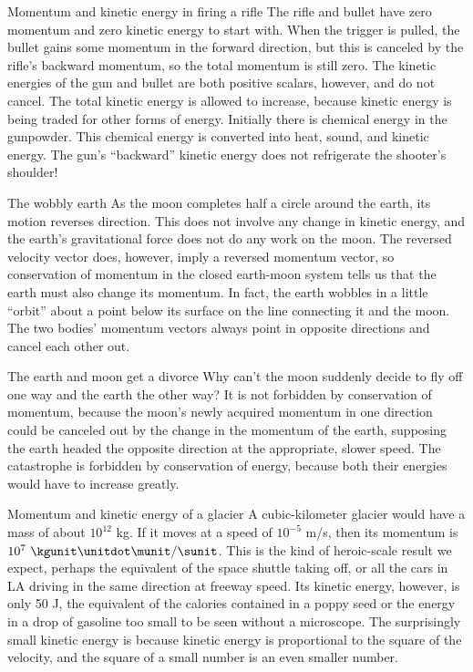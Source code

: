 \begin{eg}{Momentum and kinetic energy in firing a rifle}
The rifle and bullet have zero momentum and zero kinetic
energy to start with. When the trigger is pulled, the bullet
gains some momentum in the forward direction, but this is
canceled by the rifle's backward momentum, so the total
momentum is still zero. The kinetic energies of the gun and
bullet are both positive scalars, however, and do not
cancel. The total kinetic energy is allowed to increase,
because kinetic energy is being traded for other forms of
energy. Initially there is chemical energy in the gunpowder.
This chemical energy is converted into heat, sound, and
kinetic energy. The gun's ``backward'' kinetic energy does
not refrigerate the shooter's shoulder!
\end{eg}

\pagebreak

\begin{eg}{The wobbly earth}
As the moon completes half a circle around the earth, its
motion reverses direction. This does not involve any change
in kinetic energy, and the earth's gravitational force does
not do any work on the moon. The reversed velocity vector
does, however, imply a reversed momentum vector, so
conservation of momentum in the closed earth-moon system
tells us that the earth must also change its momentum. In
fact, the earth wobbles in a little ``orbit'' about a point
below its surface on the line connecting it and the moon.
The two bodies' momentum vectors always point in opposite
directions and cancel each other out.
\end{eg}

\begin{eg}{The earth and moon get a divorce}
Why can't the moon suddenly decide to fly off one way and
the earth the other way? It is not forbidden by conservation
of momentum, because the moon's newly acquired momentum in
one direction could be canceled out by the change in the
momentum of the earth, supposing the earth headed the
opposite direction at the appropriate, slower speed. The
catastrophe is forbidden by conservation of energy, because
both their energies would have to increase greatly.
\end{eg}

\begin{eg}{Momentum and kinetic energy of a glacier}
A cubic-kilometer glacier would have a mass of about
$10^{12}$ kg. If it moves at a speed of $10^{-5}$ m/s,
then its momentum is $10^7\ \kgunit\unitdot\munit/\sunit$. This is the kind of
heroic-scale result we expect, perhaps the equivalent of the
space shuttle taking off, or all the cars in LA driving in
the same direction at freeway speed. Its kinetic energy,
however, is only 50 J, the equivalent of the calories
contained in a poppy seed or the energy in a drop of
gasoline too small to be seen without a microscope. The
surprisingly small kinetic energy is because kinetic energy
is proportional to the square of the velocity, and the
square of a small number is an even smaller number.
\end{eg}

